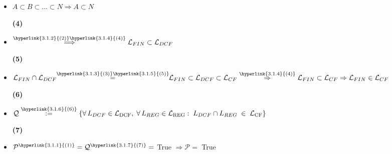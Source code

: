 \begin{tcolorbox}[colback=yellow!15!white, colframe=blue!50!white,
	fonttitle=\bfseries\Large, title = Απόδειξη]
\begin{itemize}
	\item $A \subset B \subset...\subset N \Rightarrow A \subset N$
	\reducevspace\reducevspace\reducevspace\reducevspace\reducevspace\reducevspace
	\reducevspace\reducevspace\reducevspace\reducevspace\reducevspace\reducevspace
	\reducevspace\reducevspace\reducevspace\reducevspace\reducevspace\reducevspace
	\reducevspace\reducevspace\reducevspace\reducevspace\reducevspace\reducevspace
	\begin{flushright}\hypertarget{3.1.4}{\bf{(4)}}\end{flushright}

	\item $\overset{\hyperlink{3.1.2}{(2)} \hyperlink{3.1.4}{(4)}}{\Longrightarrow} \mathcal{L}_{FIN} \subset
	\mathcal{L}_{DCF}$
	\reducevspace\reducevspace\reducevspace\reducevspace\reducevspace\reducevspace
	\reducevspace\reducevspace\reducevspace\reducevspace\reducevspace\reducevspace
	\reducevspace\reducevspace\reducevspace\reducevspace\reducevspace\reducevspace
	\reducevspace\reducevspace\reducevspace\reducevspace\reducevspace\reducevspace
	\begin{flushright}\hypertarget{3.1.5}{\bf{(5)}}\end{flushright}

	\item $\mathcal{L}_{FIN} \cap \mathcal{L}_{DCF}\!\!\overset{\hyperlink{3.1.3}{(3)}\hyperlink{3.1.5}{(5)}}{=}\!\!
	\mathcal{L}_{FIN} \subset \mathcal{L}_{DCF} \subset \mathcal{L}_{CF}
	\overset{\hyperlink{3.1.4}{(4)}}{\Rightarrow} \mathcal{L}_{FIN} \subset \mathcal{L}_{CF} \Rightarrow
	\mathcal{L}_{FIN} \in \mathcal{L}_{CF}$
	\reducevspace\reducevspace\reducevspace\reducevspace\reducevspace\reducevspace
	\reducevspace\reducevspace\reducevspace\reducevspace\reducevspace\reducevspace
	\reducevspace\reducevspace\reducevspace\reducevspace\reducevspace\reducevspace
	\reducevspace\reducevspace\reducevspace\reducevspace\reducevspace\reducevspace
	\begin{flushright}\hypertarget{3.1.6}{\bf{(6)}}\end{flushright}

	\item $\mathcal{Q} \overset{\hyperlink{3.1.6}{(6)}}{:=} \{\forall\,L_{DCF}\in\mathcal
	L_{\mathrm{DCF}},\;\forall\,L_{REG}\in\mathcal
	L_{\mathrm{REG}}:\;L_{DCF}\cap L_{REG}\;\in\;\mathcal L_{\mathrm{CF}}\}$
	\reducevspace\reducevspace\reducevspace\reducevspace\reducevspace\reducevspace
	\reducevspace\reducevspace\reducevspace\reducevspace\reducevspace\reducevspace
	\reducevspace\reducevspace\reducevspace\reducevspace\reducevspace\reducevspace
	\reducevspace\reducevspace\reducevspace\reducevspace\reducevspace\reducevspace
	\begin{flushright}\hypertarget{3.1.7}{\bf{(7)}}\end{flushright}

	\item $\mathcal{P}^{\hyperlink{3.1.1}{(1)}} = \mathcal{Q}^{\hyperlink{3.1.7}{(7)}} = $ True $ \Rightarrow
	\mathcal{P} = $ True
\end{itemize}
\end{tcolorbox}

